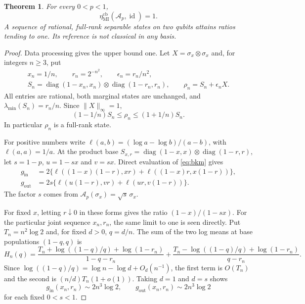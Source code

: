 \documentclass[11pt,a4paper]{article}
\newtheorem{theorem}{Theorem}
\theoremstyle{remark}\newtheorem{remark}[theorem]{Remark}
\newcommand{\id}{\operatorname{id}}
\newcommand{\cA}{\mathcal A}
\begin{document}
\begin{theorem}\label{thm:obstruction}
For every $0<p<1$,
\begin{equation}
 \eta_{\mathrm{MI}}^{\mathrm{cb}}(\cA_p,\id)=1.
 \label{eq:obstruction}
\end{equation}
A sequence of rational, full-rank separable states on two qubits attains
ratios tending to one. Its reference is not classical in any basis.
\end{theorem}
\begin{proof}
Data processing gives the upper bound one.
Let $X=\sigma_x\otimes\sigma_x$ and, for integers $n\geq3$, put
\[
 \begin{gathered}
 x_n=1/n,\qquad r_n=2^{-n^2},\qquad \epsilon_n=r_n/n^2,\\
 S_n=\operatorname{diag}(1-x_n,x_n)
        \otimes\operatorname{diag}(1-r_n,r_n),\qquad
 \rho_n=S_n+\epsilon_n X.
\end{gathered}
\]
All entries are rational, both marginal states are unchanged, and
$\lambda_{\min}(S_n)=r_n/n$.
Since $\|X\|_\infty=1$,
\begin{equation}
 (1-1/n)S_n\leq\rho_n\leq(1+1/n)S_n.
 \label{eq:finite-order}
\end{equation}
In particular $\rho_n$ is a full-rank state.

For positive numbers write
$\ell(a,b)=(\log a-\log b)/(a-b)$, with $\ell(a,a)=1/a$.
At the product base
$S_{x,r}=\operatorname{diag}(1-x,x)\otimes\operatorname{diag}(1-r,r)$,
let $s=1-p$, $u=1-sx$ and $v=sx$.
Direct evaluation of \eqref{eq:bkm} gives
\begin{align}
 g_{\mathrm{in}}
 &=2\{\ell((1-x)(1-r),xr)+\ell((1-x)r,x(1-r))\},\label{eq:gin}\\
 g_{\mathrm{out}}
 &=2s\{\ell(u(1-r),vr)+\ell(ur,v(1-r))\}.
 \label{eq:gout}
\end{align}
The factor $s$ comes from $\cA_p(\sigma_x)=\sqrt s\,\sigma_x$.

For fixed $x$, letting $r\downarrow0$ in these forms gives the ratio
$(1-x)/(1-sx)$.
For the particular joint sequence $x_n,r_n$, the same limit to one is
seen directly. Put $T_n=n^2\log2$ and, for fixed $d>0$, $q=d/n$.
The sum of the two log means at base populations $(1-q,q)$ is
\[
 H_n(q)=\frac{T_n+\log((1-q)/q)+\log(1-r_n)}{1-q-r_n}
       +\frac{T_n-\log((1-q)/q)+\log(1-r_n)}{q-r_n}.
\]
Since $\log((1-q)/q)=\log n-\log d+O_d(n^{-1})$,
the first term is $O(T_n)$ and the second is
$(n/d)T_n(1+o(1))$. Taking $d=1$ and $d=s$ shows
\[
 g_{\mathrm{in}}(x_n,r_n)\sim2n^3\log2,\qquad
 g_{\mathrm{out}}(x_n,r_n)\sim2n^3\log2
\]
for each fixed $0<s<1$.


\end{proof}
\end{document}
